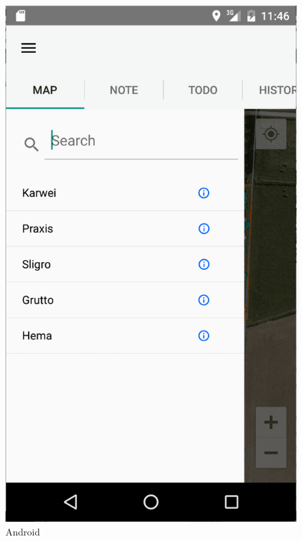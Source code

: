 \documentclass[12pt]{article}
\begin{document}
\begin{figure}[ht]
	\includegraphics[width=\linewidth, height=0.4\textheight, keepaspectratio=true, frame]{screenshots/MenuAnd.png}
	\caption{Android}
	\endminipage\hfill
\end{figure}
\clearpage
\end{document}
